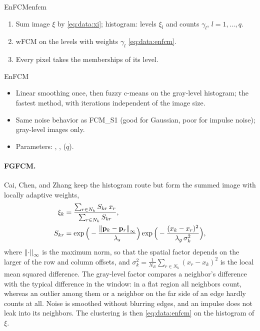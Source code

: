 \begin{algobox}{EnFCM}{enfcm}
\begin{enumerate}[leftmargin=*]
  \item Sum image $\xi$ by \eqref{eq:data:xi}; histogram: levels $\xi_l$ and counts $\gamma_l$, $l=1,\dots,q$.
  \item wFCM on the levels with weights $\gamma_l$ \eqref{eq:data:enfcm}.
  \item Every pixel takes the memberships of its level.
\end{enumerate}
\end{algobox}
\begin{summarybox}{EnFCM}
\begin{itemize}
  \item Linear smoothing once, then fuzzy c-means on the gray-level histogram; the fastest method, with iterations independent of the image size.
  \item Same noise behavior as FCM\_S1 (good for Gaussian, poor for impulse noise); gray-level images only.
  \item Parameters: , ,  ($q$).
\end{itemize}
\end{summarybox}

\paragraph{FGFCM.} Cai, Chen, and Zhang \cite{cai:2007:fgfcm} keep the histogram route but form the summed image with locally adaptive weights,
\begin{equation}
  \begin{aligned}
  \xi_k&=\frac{\sum_{r\in N_k}S_{kr}\,x_r}{\sum_{r\in N_k}S_{kr}},\\
  S_{kr}&=\exp\Big(-\frac{\left\lVert \mathbf{p}_k-\mathbf{p}_r \right\rVert_\infty}{\lambda_s}\Big)\exp\Big(-\frac{(x_k-x_r)^2}{\lambda_g\,\sigma_k^2}\Big),
  \end{aligned}
  \label{eq:data:fgfcm}
\end{equation}
where $\left\lVert \cdot \right\rVert_\infty$ is the maximum norm, so that the spatial factor depends on the larger of the row and column offsets, and $\sigma_k^2=\frac{1}{N_R}\sum_{r\in N_k}(x_r-x_k)^2$ is the local mean squared difference. The gray-level factor compares a neighbor's difference with the typical difference in the window: in a flat region all neighbors count, whereas an outlier among them or a neighbor on the far side of an edge hardly counts at all. Noise is smoothed without blurring edges, and an impulse does not leak into its neighbors. The clustering is then \eqref{eq:data:enfcm} on the histogram of $\xi$.

